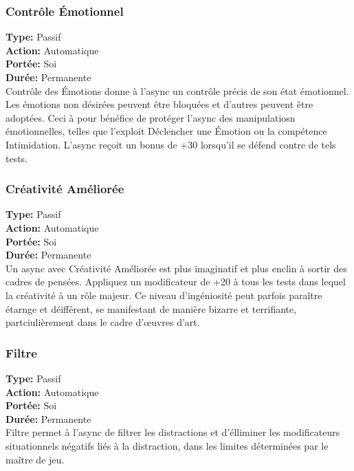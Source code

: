 \subsubsection{Contrôle Émotionnel} \textbf{Type:} Passif \\ \textbf{Action:} Automatique \\ \textbf{Portée:} Soi \\ \textbf{Durée:} Permanente \\ Contrôle des Émotions donne à l'async un contrôle précis de son état émotionnel. Les émotions non désirées peuvent être bloquées et d'autres peuvent être adoptées. Ceci à pour bénéfice de protéger l'async des manipulatiosn émotionnelles, telles que l'exploit Déclencher une Émotion ou la compétence Intimidation. L'async reçoit un bonus de +30 lorsqu'il se défend contre de tels tests. 

\subsubsection{Créativité Améliorée} \textbf{Type:} Passif \\ \textbf{Action:} Automatique \\ \textbf{Portée:} Soi \\ \textbf{Durée:} Permanente \\ Un async avec Créativité Améliorée est plus imaginatif et plus enclin à sortir des cadres de pensées. Appliquez un modificateur de +20 à tous les tests dans lequel la créativité à un rôle majeur. Ce niveau d'ingéniosité peut parfois paraître étarnge et déifférent, se manifestant de manière bizarre et terrifiante, partciulièrement dans le cadre d'œuvres d'art. 

\subsubsection{Filtre} \textbf{Type:} Passif \\ \textbf{Action:} Automatique \\ \textbf{Portée:} Soi \\ \textbf{Durée:} Permanente \\ Filtre permet à l'async de filtrer les distractions et d'élliminer les modificateurs situationnels négatifs liés à la distraction, dans les limites déterminées par le maître de jeu. 

